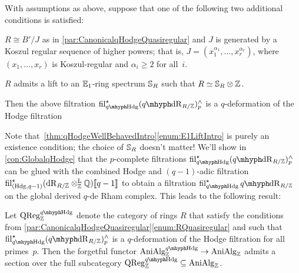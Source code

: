 \documentclass[DIV=12,numbers=enddot,leqno,bibliography=totoc]{scrartcl}
\begin{document}
	\begin{thm}\label{thm:qHodgeWellBehavedIntro}
		With assumptions as above, suppose that one of the following two additional conditions is satisfied:
		\begin{alphanumerate}
			\item $R\cong B'/J$ as in \cref{par:CanonicalqHodgeQuasiregular} and $J$ is generated by a Koszul regular sequence of higher powers; that is, $J=(x_1^{\alpha_1},\dotsc,x_r^{\alpha_r})$, where $(x_1,\dotsc,x_r)$ is Koszul-regular and $\alpha_i\geqslant 2$ for all~$i$.\label{enum:RegularSequenceHigherPowersIntro}
			\item $R$ admits a lift to an $\mathbb{E}_1$-ring spectrum $\mathbb{S}_R$ such that $R\simeq \mathbb{S}_R\otimes\mathbb{Z}$.\label{enum:E1LiftIntro}
		\end{alphanumerate}
		Then the above filtration $\fil_{\qHodge}^\star(\qdeRham_{R/\IZ})_p^\complete$ is a $q$-deformation of the Hodge filtration
	\end{thm}
	Note that~\cref{thm:qHodgeWellBehavedIntro}\cref{enum:E1LiftIntro} is purely an existence condition; the choice of $\mathbb{S}_R$ doesn't matter! We'll show in \cref{con:GlobalqHodge} that the $p$-complete filtrations $\fil_{\qHodge}^\star(\qdeRham_{R/\IZ})_p^\complete$ can be glued with the combined Hodge and $(q-1)$-adic filtration $\operatorname{fil}_{(\mathrm{Hdg},q-1)}^\star(\mathrm{dR}_{R/\mathbb{Z}}\otimes^{\mathrm{L}}_{\mathbb{Z}}\mathbb{Q})\llbracket q-1\rrbracket$ to obtain a filtration $\fil_{\qHodge}^\star\qdeRham_{R/\IZ}$ on the global derived $q$-de Rham complex. This leads to the following result:
	
	\begin{thm}\label{thm:CanonicalqHodgeQuasiregularIntro}
		Let $\cat{QReg}_\IZ^{\qHodge}$ denote the category of rings $R$ that satisfy the conditions from \cref{par:CanonicalqHodgeQuasiregular}\cref{enum:RQuasiregular} and such that $\fil_{\qHodge}^\star(\qdeRham_{R/\IZ})_p^\complete$ is a $q$-deformation of the Hodge filtration for all primes~$p$. Then the forgetful functor $\cat{AniAlg}_\IZ^{\qHodge}\rightarrow \cat{AniAlg}_\IZ$ admits a section over the full subcategory $\cat{QReg}_\IZ^{\qHodge}\subseteq \cat{AniAlg}_\IZ$.
	\end{thm}
	
\end{document}
